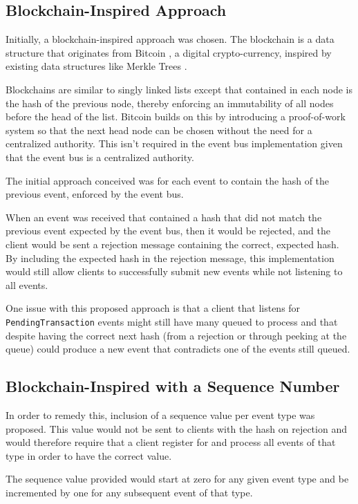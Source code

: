 \documentclass{l3proj}
\begin{document}
\subsection{Blockchain-Inspired Approach}
Initially, a blockchain-inspired approach was chosen. The blockchain \cite{blockchain} is a data structure that originates from Bitcoin \cite{bitcoin}, a digital crypto-currency, inspired by existing data structures like Merkle Trees \cite{merkletree}.

Blockchains are similar to singly linked lists except that contained in each node is the hash of the previous node, thereby enforcing an immutability of all nodes before the head of the list. Bitcoin builds on this by introducing a proof-of-work system so that the next head node can be chosen without the need for a centralized authority. This isn't required in the event bus implementation given that the event bus is a centralized authority.

The initial approach conceived was for each event to contain the hash of the previous event, enforced by the event bus.



When an event was received that contained a hash that did not match the previous event expected by the event bus, then it would be rejected, and the client would be sent a rejection message containing the correct, expected hash. By including the expected hash in the rejection message, this implementation would still allow clients to successfully submit new events while not listening to all events.

One issue with this proposed approach is that a client that listens for \texttt{PendingTransaction} events might still have many queued to process and that despite having the correct next hash (from a rejection or through peeking at the queue) could produce a new event that contradicts one of the events still queued.

\subsection{Blockchain-Inspired with a Sequence Number}
In order to remedy this, inclusion of a sequence value per event type was proposed. This value would not be sent to clients with the hash on rejection and would therefore require that a client register for and process all events of that type in order to have the correct value.

The sequence value provided would start at zero for any given event type and be incremented by one for any subsequent event of that type.
\end{document}
